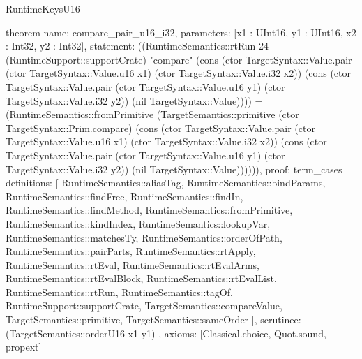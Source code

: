 \begin{lexlean}{RuntimeKeysU16}
\begin{semanticmodule}
theorem{
  name: compare_pair_u16_i32,
  parameters: [x1 : UInt16, y1 : UInt16, x2 : Int32, y2 : Int32],
  statement: ((RuntimeSemantics::rtRun 24 (RuntimeSupport::supportCrate) "compare" (cons (ctor TargetSyntax::Value.pair (ctor TargetSyntax::Value.u16 x1) (ctor TargetSyntax::Value.i32 x2)) (cons (ctor TargetSyntax::Value.pair (ctor TargetSyntax::Value.u16 y1) (ctor TargetSyntax::Value.i32 y2)) (nil TargetSyntax::Value)))) = (RuntimeSemantics::fromPrimitive (TargetSemantics::primitive (ctor TargetSyntax::Prim.compare) (cons (ctor TargetSyntax::Value.pair (ctor TargetSyntax::Value.u16 x1) (ctor TargetSyntax::Value.i32 x2)) (cons (ctor TargetSyntax::Value.pair (ctor TargetSyntax::Value.u16 y1) (ctor TargetSyntax::Value.i32 y2)) (nil TargetSyntax::Value)))))),
  proof: term_cases{
    definitions: [
      RuntimeSemantics::aliasTag,
      RuntimeSemantics::bindParams,
      RuntimeSemantics::findFree,
      RuntimeSemantics::findIn,
      RuntimeSemantics::findMethod,
      RuntimeSemantics::fromPrimitive,
      RuntimeSemantics::kindIndex,
      RuntimeSemantics::lookupVar,
      RuntimeSemantics::matchesTy,
      RuntimeSemantics::orderOfPath,
      RuntimeSemantics::pairParts,
      RuntimeSemantics::rtApply,
      RuntimeSemantics::rtEval,
      RuntimeSemantics::rtEvalArms,
      RuntimeSemantics::rtEvalBlock,
      RuntimeSemantics::rtEvalList,
      RuntimeSemantics::rtRun,
      RuntimeSemantics::tagOf,
      RuntimeSupport::supportCrate,
      TargetSemantics::compareValue,
      TargetSemantics::primitive,
      TargetSemantics::sameOrder
    ],
    scrutinee: (TargetSemantics::orderU16 x1 y1)
  },
  axioms: [Classical.choice, Quot.sound, propext]
}


\end{semanticmodule}
\end{lexlean}
